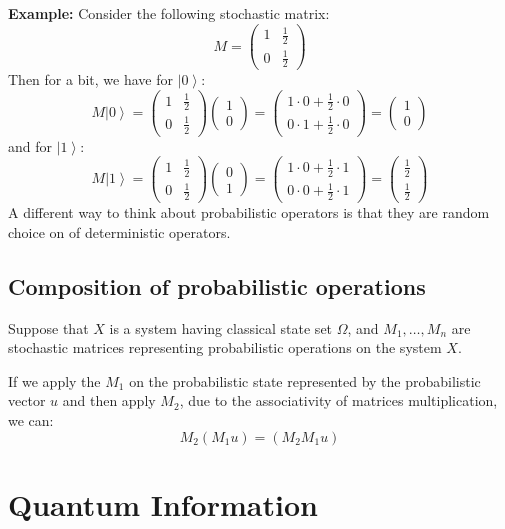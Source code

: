 \documentclass[12pt]{article} %
\newcommand{\ket}[1]{\left|#1\right\rangle}
\begin{document}
\textbf{Example:} Consider the following stochastic matrix:
$$
M = \begin{pmatrix} 1 & \frac{1}{2} \\ 0 & \frac{1}{2} \end{pmatrix}
$$
Then for a bit, we have for $\ket{0}$:
$$
M\ket{0} = \begin{pmatrix} 1 & \frac{1}{2} \\ 0 & \frac{1}{2} \end{pmatrix} \begin{pmatrix} 1 \\ 0 \end{pmatrix} = \begin{pmatrix} 1\cdot0 + \frac{1}{2}\cdot0 \\ 0\cdot1 + \frac{1}{2}\cdot0 \end{pmatrix} = \begin{pmatrix} 1 \\ 0 \end{pmatrix}
$$
and for $\ket{1}$:
$$
M\ket{1} = \begin{pmatrix} 1 & \frac{1}{2} \\ 0 & \frac{1}{2} \end{pmatrix} \begin{pmatrix} 0 \\ 1 \end{pmatrix} = \begin{pmatrix} 1\cdot0 + \frac{1}{2}\cdot1 \\ 0\cdot0 + \frac{1}{2}\cdot1 \end{pmatrix} = \begin{pmatrix} \frac{1}{2} \\ \frac{1}{2} \end{pmatrix}
$$
A different way to think about probabilistic operators is that they are random choice on of deterministic operators.
\subsection{Composition of probabilistic operations}
Suppose that $X$ is a system having classical state set $\Omega$, and $M_1, \dots, M_n $ are stochastic matrices representing probabilistic operations on the system $X$.

If we apply the $M_1$ on the probabilistic state represented by the probabilistic vector $u$ and then apply $M_2$, due to the associativity of matrices multiplication, we can:
$$
M_2(M_1u) = (M_2M_1u)
$$

\section{Quantum Information}
\end{document}

